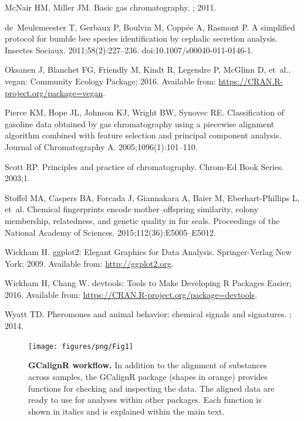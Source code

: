 \documentclass[10pt,letterpaper]{article}
\begin{document}
\begin{thebibliography}{10}
McNair HM, Miller JM.
\newblock Basic gas chromatography.
; 2011.

de~Meulemeester T, Gerbaux P, Boulvin M, Copp{\'e}e A, Rasmont P.
\newblock A simplified protocol for bumble bee species identification by
  cephalic secretion analysis.
\newblock Insectes Sociaux. 2011;58(2):227--236.
\newblock doi:{10.1007/s00040-011-0146-1}.

Oksanen J, Blanchet FG, Friendly M, Kindt R, Legendre P, McGlinn D, et~al..
  vegan: Community Ecology Package; 2016.
\newblock Available from: \url{https://CRAN.R-project.org/package=vegan}.

Pierce KM, Hope JL, Johnson KJ, Wright BW, Synovec RE.
\newblock Classification of gasoline data obtained by gas chromatography using
  a piecewise alignment algorithm combined with feature selection and principal
  component analysis.
\newblock Journal of Chromatography A. 2005;1096(1):101--110.

Scott RP.
\newblock Principles and practice of chromatography.
\newblock Chrom-Ed Book Series. 2003;1.

Stoffel MA, Caspers BA, Forcada J, Giannakara A, Baier M, Eberhart-Phillips L,
  et~al.
\newblock Chemical fingerprints encode mother--offspring similarity, colony
  membership, relatedness, and genetic quality in fur seals.
\newblock Proceedings of the National Academy of Sciences.
  2015;112(36):E5005--E5012.

Wickham H.
\newblock ggplot2: Elegant Graphics for Data Analysis.
\newblock Springer-Verlag New York; 2009.
\newblock Available from: \url{http://ggplot2.org}.


Wickham H, Chang W. devtools: Tools to Make Developing R Packages Easier; 2016.
\newblock Available from: \url{https://CRAN.R-project.org/package=devtools}.

Wyatt TD.
\newblock Pheromones and animal behavior: chemical signals and signatures.
; 2014.

\end{thebibliography}

\newpage
\begin{figure}[htbp]
\centering
\texttt{[image: figures/png/Fig1]}
\caption{\textbf{GCalignR workflow.}
In addition to the alignment of substances across samples, the GCalignR package (shapes in orange) provides functions for checking and inspecting the data. The aligned data are ready to use for analyses within other packages. Each function is shown in italics and is explained within the main text.}
\label{Fig:Fig1}
\end{figure}
\end{document}
